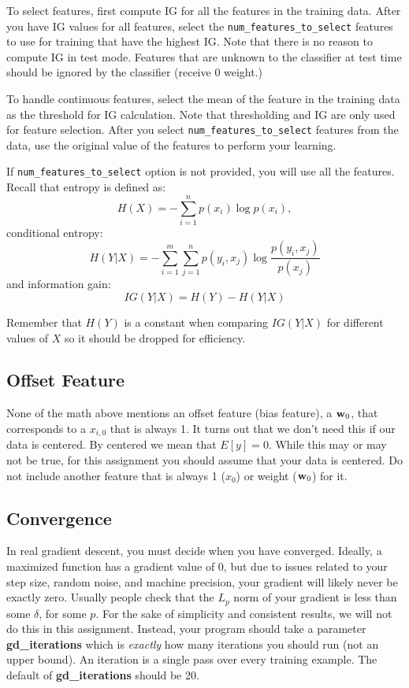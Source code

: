 \documentclass[11pt]{article}
\newcommand{\vw}{{\bf w}}
\begin{document}
To select features, first compute IG for all the features in the training data. After you have IG values for all features, select the {\tt num\_features\_to\_select} features to use for training that have the highest IG. Note that there is no reason to compute IG in test mode. Features that are unknown to the classifier at test time should be ignored by the classifier (receive 0 weight.)

To handle continuous features, select the mean of the feature in the training data as the threshold for IG calculation. Note that thresholding and IG are only used for feature selection. After you select {\tt num\_features\_to\_select} features from the data, use the original value of the features to perform your learning. 

If {\tt num\_features\_to\_select} option is not provided, you will use all the features.
\\

Recall that entropy is defined as:
\[
H(X) = -\sum_{i=1}^n p(x_i) \log p(x_i),
\]
conditional entropy:
\[
H(Y|X) =  - \sum_{i = 1}^m \sum_{j=1}^n p(y_i,x_j) \log \frac{p(y_i,x_j)}{p(x_j)}
\]
and information gain:
\[
IG(Y|X) = H(Y) - H(Y|X)
\]

Remember that $H(Y)$ is a constant when comparing $IG(Y|X)$ for different values of $X$ so it should be dropped for efficiency.


\subsection{Offset Feature}
None of the math above mentions an offset feature (bias feature), a $\vw_0$, that corresponds to a $x_{i,0}$ that is always 1. It turns out that we don't need this if our data is centered. By centered we mean that $E[y] = 0$. While this may or may not be true, for this assignment you should assume that your data is centered. Do not include another feature that is always 1 ($x_0$) or weight ($\vw_0$) for it.


\subsection{Convergence}
In real gradient descent, you must decide when you have converged. Ideally, a maximized function has a gradient value of 0, but due to issues related to your step size, random noise, and machine precision, your gradient will likely never be exactly zero. Usually people check that the $L_p$ norm of your gradient is less than some $\delta$, for some $p$. For the sake of simplicity and consistent results, we will not do this in this assignment. Instead, your program should take a parameter \textbf{gd\_iterations} which is \emph{exactly} how many iterations you should run (not an upper bound). An iteration is a single pass over every training example.
The default of \textbf{gd\_iterations} should be 20.
\end{document}
